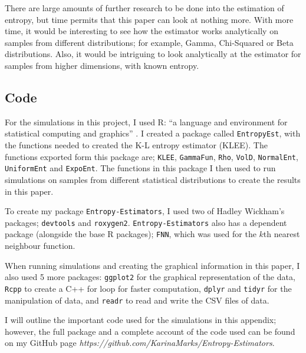 \documentclass[12pt]{report}
\begin{document}
There are large amounts of further research to be done into the estimation of entropy, but time permits that this paper can look at nothing more. With more time, it would be interesting to see how the estimator works analytically on samples from different distributions; for example, Gamma, Chi-Squared or Beta distributions. Also, it would be intriguing to look analytically at the estimator for samples from higher dimensions, with known entropy.






\begin{appendix}


\lstset{showstringspaces=false, breaklines=true}

\chapter{Code} \label{appendix_code}

For the simulations in this project, I used R: ``a language and environment for statistical computing and graphics'' \cite{code1}. I created a package called \texttt{EntropyEst}, with the functions needed to created the K-L entropy estimator (KLEE). The functions exported form this package are; \texttt{KLEE}, \texttt{GammaFun}, \texttt{Rho}, \texttt{VolD}, \texttt{NormalEnt}, \texttt{UniformEnt} and \texttt{ExpoEnt}. The functions in this package I then used to run simulations on samples from different statistical distributions to create the results in this paper.

To create my package \texttt{Entropy-Estimators}, I used two of Hadley Wickham's \cite{code2} packages; \texttt{devtools} and \texttt{roxygen2}. \texttt{Entropy-Estimators} also has a dependent package (alongside the base R packages); \texttt{FNN}, which was used for the $k$th nearest neighbour function. 

When running simulations and creating the graphical information in this paper, I also used 5 more packages: \texttt{ggplot2} for the graphical representation of the data, \texttt{Rcpp} to create a C++ for loop for faster computation, \texttt{dplyr} and \texttt{tidyr} for the manipulation of data, and \texttt{readr} to read and write the CSV files of data.

I will outline the important code used for the simulations in this appendix; however, the full package and a complete account of the code used can be found on my GitHub page \textit{https://github.com/KarinaMarks/Entropy-Estimators}.


\end{appendix}
\end{document}
